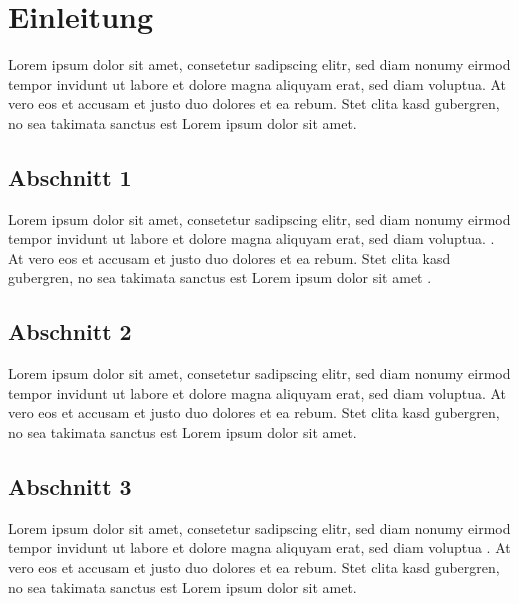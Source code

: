 

\chapter{Einleitung}
\label{ch:Einleitung}

Lorem ipsum dolor sit amet, consetetur sadipscing elitr, sed diam nonumy eirmod
tempor invidunt ut labore et dolore magna aliquyam erat, sed diam voluptua. At
vero eos et accusam et justo duo dolores et ea rebum. Stet clita kasd gubergren,
no sea takimata sanctus est Lorem ipsum dolor sit amet.

\section{Abschnitt 1}
\label{ch:Einleitung:sec:Abschnitt1}

Lorem ipsum dolor sit amet, consetetur sadipscing elitr, sed diam nonumy eirmod
tempor invidunt ut labore et dolore magna aliquyam erat, sed diam voluptua.
\cite{TB98}. At vero eos et accusam et justo duo dolores et ea rebum. Stet clita
kasd gubergren, no sea takimata sanctus est Lorem ipsum dolor sit amet
\cite{techrep1}.

\section{Abschnitt 2}
\label{ch:Einleitung:sec:Abschnitt2}

Lorem ipsum dolor sit amet, consetetur sadipscing elitr, sed diam nonumy eirmod
tempor invidunt ut labore et dolore magna aliquyam erat, sed diam voluptua. At
vero eos et accusam et justo duo dolores et ea rebum. Stet clita kasd gubergren,
no sea takimata sanctus \cite{JSAC96} est Lorem ipsum dolor sit amet.

\section{Abschnitt 3}
\label{ch:Einleitung:sec:Abschnitt3}

Lorem ipsum dolor sit amet, consetetur sadipscing elitr, sed diam nonumy eirmod
tempor invidunt ut labore et dolore magna aliquyam erat, sed diam voluptua
\cite{beethoven}. At vero eos et accusam et justo duo dolores et ea rebum. Stet
clita kasd gubergren, no sea takimata sanctus est Lorem ipsum dolor sit amet.



